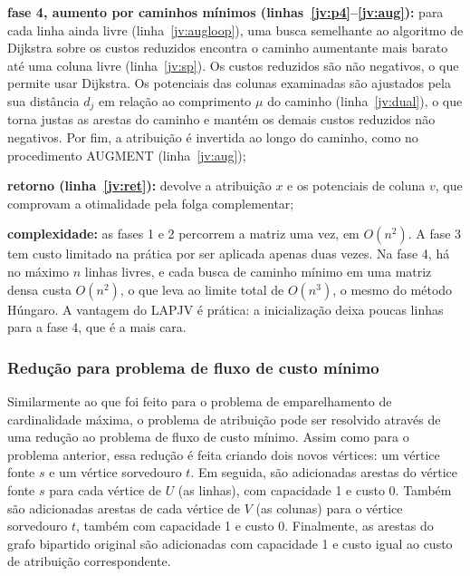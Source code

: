 \begin{alineas}
\begin{alineas}
    \end{alineas}
    \item \textbf{fase 4, aumento por caminhos mínimos (linhas~\ref{jv:p4}--\ref{jv:aug}):} para cada linha ainda livre (linha~\ref{jv:augloop}), uma busca semelhante ao algoritmo de Dijkstra sobre os custos reduzidos encontra o caminho aumentante mais barato até uma coluna livre (linha~\ref{jv:sp}). Os custos reduzidos são não negativos, o que permite usar Dijkstra. Os potenciais das colunas examinadas são ajustados pela sua distância $d_j$ em relação ao comprimento $\mu$ do caminho (linha~\ref{jv:dual}), o que torna justas as arestas do caminho e mantém os demais custos reduzidos não negativos. Por fim, a atribuição é invertida ao longo do caminho, como no procedimento AUGMENT (linha~\ref{jv:aug});
    \item \textbf{retorno (linha~\ref{jv:ret}):} devolve a atribuição $x$ e os potenciais de coluna $v$, que comprovam a otimalidade pela folga complementar;
    \item \textbf{complexidade:} as fases 1 e 2 percorrem a matriz uma vez, em $O(n^2)$. A fase 3 tem custo limitado na prática por ser aplicada apenas duas vezes. Na fase 4, há no máximo $n$ linhas livres, e cada busca de caminho mínimo em uma matriz densa custa $O(n^2)$, o que leva ao limite total de $O(n^3)$, o mesmo do método Húngaro. A vantagem do LAPJV é prática: a inicialização deixa poucas linhas para a fase 4, que é a mais cara.
\end{alineas}

\subsubsection{Redução para problema de fluxo de custo mínimo}
\label{p:reduction_to_minimal_flow}

Similarmente ao que foi feito para o problema de emparelhamento de cardinalidade máxima, o problema de atribuição pode ser resolvido através de uma redução ao problema de fluxo de custo mínimo. Assim como para o problema anterior, essa redução é feita criando dois novos vértices: um vértice fonte $s$ e um vértice sorvedouro $t$. Em seguida, são adicionadas arestas do vértice fonte $s$ para cada vértice de $U$ (as linhas), com capacidade 1 e custo 0. Também são adicionadas arestas de cada vértice de $V$ (as colunas) para o vértice sorvedouro $t$, também com capacidade 1 e custo 0. Finalmente, as arestas do grafo bipartido original são adicionadas com capacidade 1 e custo igual ao custo de atribuição correspondente.

